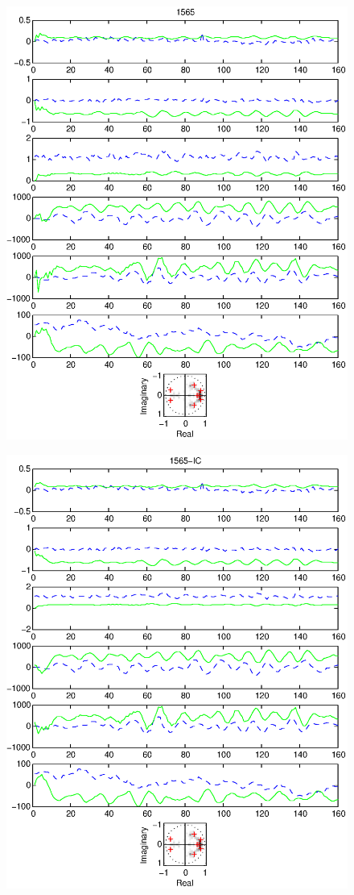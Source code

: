 \documentclass{article}
\begin{document}
\begin{figure}[htb!]
\centering
\includegraphics{1565.eps}
\end{figure}\clearpage
\begin{figure}[htb!]
\centering
\includegraphics{1565_ic.eps}
\end{figure}\clearpage
\end{document}
